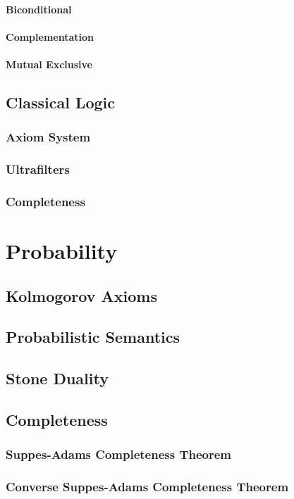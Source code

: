 \documentclass[a4paper,11pt]{book}
\begin{document}
\subsubsection{Biconditional}
\subsubsection{Complementation}
\subsubsection{Mutual Exclusive}
\section{Classical Logic}
\subsection{Axiom System}
\subsection{Ultrafilters}
\subsection{Completeness}

\chapter{Probability}
\section{Kolmogorov Axioms}
\section{Probabilistic Semantics}
\section{Stone Duality}
\section{Completeness}
\subsection{Suppes-Adams Completeness Theorem}
\subsection{Converse Suppes-Adams Completeness Theorem}
\end{document}
